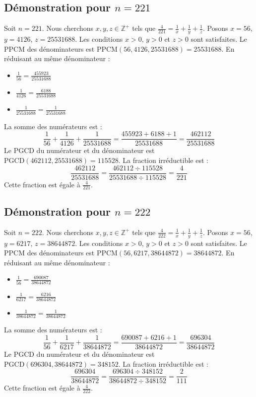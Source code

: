 \documentclass[11pt,a4paper]{article}
\begin{document}
\subsection{Démonstration pour $n = 221$}
Soit $n = 221$. Nous cherchons $x, y, z \in \mathbb{Z}^{+}$ tels que $\frac{4}{221} = \frac{1}{x} + \frac{1}{y} + \frac{1}{z}$.
Posons $x = 56$, $y = 4126$, $z = 25531688$.
Les conditions $x > 0$, $y > 0$ et $z > 0$ sont satisfaites.
Le PPCM des dénominateurs est $\text{PPCM}(56, 4126, 25531688) = 25531688$.
En réduisant au même dénominateur :
\begin{itemize}
    \item $\frac{1}{56} = \frac{455923}{25531688}$
    \item $\frac{1}{4126} = \frac{6188}{25531688}$
    \item $\frac{1}{25531688} = \frac{1}{25531688}$
\end{itemize}
La somme des numérateurs est :
$$ \frac{1}{56} + \frac{1}{4126} + \frac{1}{25531688} = \frac{455923 + 6188 + 1}{25531688} = \frac{462112}{25531688} $$
Le PGCD du numérateur et du dénominateur est $\text{PGCD}(462112, 25531688) = 115528$.
La fraction irréductible est :
$$ \frac{462112}{25531688} = \frac{462112 \div 115528}{25531688 \div 115528} = \frac{4}{221} $$
Cette fraction est égale à $\frac{4}{221}$.

\subsection{Démonstration pour $n = 222$}
Soit $n = 222$. Nous cherchons $x, y, z \in \mathbb{Z}^{+}$ tels que $\frac{4}{222} = \frac{1}{x} + \frac{1}{y} + \frac{1}{z}$.
Posons $x = 56$, $y = 6217$, $z = 38644872$.
Les conditions $x > 0$, $y > 0$ et $z > 0$ sont satisfaites.
Le PPCM des dénominateurs est $\text{PPCM}(56, 6217, 38644872) = 38644872$.
En réduisant au même dénominateur :
\begin{itemize}
    \item $\frac{1}{56} = \frac{690087}{38644872}$
    \item $\frac{1}{6217} = \frac{6216}{38644872}$
    \item $\frac{1}{38644872} = \frac{1}{38644872}$
\end{itemize}
La somme des numérateurs est :
$$ \frac{1}{56} + \frac{1}{6217} + \frac{1}{38644872} = \frac{690087 + 6216 + 1}{38644872} = \frac{696304}{38644872} $$
Le PGCD du numérateur et du dénominateur est $\text{PGCD}(696304, 38644872) = 348152$.
La fraction irréductible est :
$$ \frac{696304}{38644872} = \frac{696304 \div 348152}{38644872 \div 348152} = \frac{2}{111} $$
Cette fraction est égale à $\frac{4}{222}$.
\end{document}
